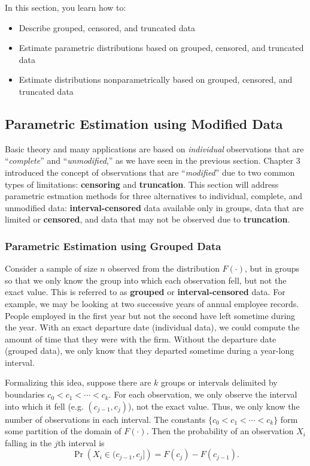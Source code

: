 \documentclass[]{book}
\providecommand{\tightlist}{%
  \setlength{\itemsep}{0pt}\setlength{\parskip}{0pt}}
\theoremstyle{definition}
\theoremstyle{definition}
\theoremstyle{definition}
\theoremstyle{remark}
\begin{document}
In this section, you learn how to:

\begin{itemize}
\tightlist
\item
  Describe grouped, censored, and truncated data
\item
  Estimate parametric distributions based on grouped, censored, and
  truncated data
\item
  Estimate distributions nonparametrically based on grouped, censored,
  and truncated data
\end{itemize}

\subsection{Parametric Estimation using Modified
Data}\label{parametric-estimation-using-modified-data}

Basic theory and many applications are based on \emph{individual}
observations that are ``\emph{complete}'' and ``\emph{unmodified},'' as
we have seen in the previous section. Chapter 3 introduced the concept
of observations that are ``\emph{modified}'' due to two common types of
limitations: \textbf{censoring} and \textbf{truncation}. This section
will address parametric estmation methods for three alternatives to
individual, complete, and unmodified data: \textbf{interval-censored}
data available only in groups, data that are limited or
\textbf{censored}, and data that may not be observed due to
\textbf{truncation}.

\subsubsection{Parametric Estimation using Grouped
Data}\label{S:GroupedData}

Consider a sample of size \(n\) observed from the distribution
\(F(\cdot)\), but in groups so that we only know the group into which
each observation fell, but not the exact value. This is referred to as
\textbf{grouped} or \textbf{interval-censored} data. For example, we may
be looking at two successive years of annual employee records. People
employed in the first year but not the second have left sometime during
the year. With an exact departure date (individual data), we could
compute the amount of time that they were with the firm. Without the
departure date (grouped data), we only know that they departed sometime
during a year-long interval.

Formalizing this idea, suppose there are \(k\) groups or intervals
delimited by boundaries \(c_0 < c_1< \cdots < c_k\). For each
observation, we only observe the interval into which it fell (e.g.
\((c_{j-1}, c_j)\)), not the exact value. Thus, we only know the number
of observations in each interval. The constants
\(\{c_0 < c_1 < \cdots < c_k\}\) form some partition of the domain of
\(F(\cdot)\). Then the probability of an observation \(X_i\) falling in
the \(j\)th interval is \[\Pr\left(X
_i \in (c_{j-1}, c_j]\right) = F(c_j) - F(c_{j-1}).\]
\end{document}
